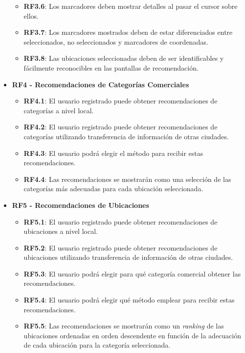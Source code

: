 \begin{itemize}
\begin{itemize}
			\item \textbf{RF3.6}: Los marcadores deben mostrar detalles al pasar el cursor sobre ellos.
			\item \textbf{RF3.7}: Los marcadores mostrados deben de estar diferenciados entre seleccionados, no seleccionados y marcadores de coordenadas.
			\item \textbf{RF3.8}: Las ubicaciones seleccionadas deben de ser identificables y fácilmente reconocibles en las pantallas de recomendación.
		\end{itemize}
	\item \textbf{RF4 - Recomendaciones de Categorías Comerciales}
	\begin{itemize}
		\item \textbf{RF4.1}: El usuario registrado puede obtener recomendaciones de categorías a nivel local.
		\item \textbf{RF4.2}: El usuario registrado puede obtener recomendaciones de categorías utilizando transferencia de información de otras ciudades.
		\item \textbf{RF4.3}: El usuario podrá elegir el método para recibir estas recomendaciones.
		\item \textbf{RF4.4}: Las recomendaciones se mostrarán como una selección de las categorías más adecuadas para cada ubicación seleccionada.
	\end{itemize}
	\item \textbf{RF5 - Recomendaciones de Ubicaciones}
	\begin{itemize}
		\item \textbf{RF5.1}: El usuario registrado puede obtener recomendaciones de ubicaciones a nivel local.
		\item \textbf{RF5.2}: El usuario registrado puede obtener recomendaciones de ubicaciones utilizando transferencia de información de otras ciudades.
		\item \textbf{RF5.3}: El usuario podrá elegir para qué categoría comercial obtener las recomendaciones.
		\item \textbf{RF5.4}: El usuario podrá elegir qué método emplear para recibir estas recomendaciones.
		\item  \textbf{RF5.5}: Las recomendaciones se mostrarán como un \textit{ranking} de las ubicaciones ordenadas en orden descendente en función de la adecuación de cada ubicación para la categoría seleccionada.
		
	\end{itemize}
	

\end{itemize}
